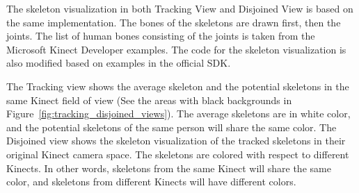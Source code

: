 The skeleton visualization in both Tracking View and Disjoined View is based on the same implementation. The bones of the skeletons are drawn first, then the joints. The list of human bones consisting of the joints is taken from the Microsoft Kinect Developer examples. The code for the skeleton visualization is also modified based on examples in the official SDK.

The Tracking view shows the average skeleton and the potential skeletons in the same Kinect field of view (See the areas with black backgrounds in Figure~\ref{fig:tracking_disjoined_views}). The average skeletons are in white color, and the potential skeletons of the same person will share the same color. The Disjoined view shows the skeleton visualization of the tracked skeletons in their original Kinect camera space. The skeletons are colored with respect to different Kinects. In other words, skeletons from the same Kinect will share the same color, and skeletons from different Kinects will have different colors.

